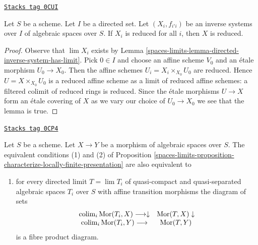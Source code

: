 \begin{lemma}
\label{spaces-limits-lemma-directed-inverse-system-reduced}
\href{https://stacks.math.columbia.edu/tag/0CUI}{\texttt{Stacks tag 0CUI}}

Let $S$ be a scheme. Let $I$ be a directed set.
Let $(X_i, f_{i'i})$ be an inverse systems over $I$
of algebraic spaces over $S$. If $X_i$ is reduced
for all $i$, then $X$ is reduced.
\end{lemma}

\begin{proof}
Observe that $\lim X_i$ exists by
Lemma \ref{spaces-limits-lemma-directed-inverse-system-has-limit}.
Pick $0 \in I$ and choose an affine scheme $V_0$ and an \'etale morphism
$U_0 \to X_0$. Then the affine schemes
$U_i = X_i \times_{X_0} U_0$ are reduced.
Hence $U = X \times_{X_0} U_0$
is a reduced affine scheme as a limit of reduced affine schemes:
a filtered colimit of reduced rings is reduced.
Since the \'etale morphisms $U \to X$ form an
\'etale covering of $X$ as we vary our choice of $U_0 \to X_0$
we see that the lemma is true.
\end{proof}

\begin{lemma}
\label{spaces-limits-lemma-better-characterize-relative-limit-preserving}
\href{https://stacks.math.columbia.edu/tag/0CP4}{\texttt{Stacks tag 0CP4}}

Let $S$ be a scheme. Let $X \to Y$ be a morphism of algebraic spaces
over $S$. The equivalent conditions (1) and (2) of
Proposition \ref{spaces-limits-proposition-characterize-locally-finite-presentation}
are also equivalent to
\begin{enumerate}
\item[(3)] for every directed limit $T = \lim T_i$ of quasi-compact
and quasi-separated algebraic spaces $T_i$ over $S$ with affine
transition morphisms the diagram of sets
$$
\begin{array}{cc}\operatorname{colim}_i \operatorname{Mor}(T_i, X) \longrightarrow\downarrow & \operatorname{Mor}(T, X) \downarrow \\ \operatorname{colim}_i \operatorname{Mor}(T_i, Y) \longrightarrow & \operatorname{Mor}(T, Y)\end{array}
$$
is a fibre product diagram.
\end{enumerate}
\end{lemma}

